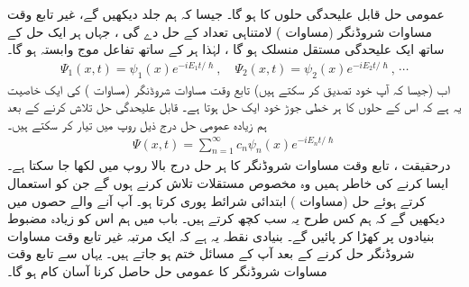  \quad
عمومی حل قابل علیحدگی حلوں کا  ہو گا۔ جیسا کہ ہم جلد دیکھیں گے، غیر تابع وقت مساوات شروڈنگر (مساوات )  لامتناہی تعداد کے حل  دے گی ،  جہاں ہر ایک حل کے ساتھ ایک علیحدگی مستقل  منسلک ہو گا ، لہٰذا ہر   کے ساتھ    تفاعل موج   وابستہ ہو گا۔ 
\begin{align*}
\Psi_{1} (x,t) = \psi_{1}(x)e^{-iE_{1}t/\hslash} , \quad \Psi_{2} (x,t) = \psi_{2}(x)e^{-iE_{2}t/\hslash}, \, \cdots 
\end{align*}
اب (جیسا کہ آپ خود تصدیق کر سکتے ہیں) تابع وقت مساوات شروڈنگر (مساوات ) کی ایک خاصیت یہ ہے کہ اس کے حلوں کا ہر خطی جوڑ خود ایک حل ہوتا ہے۔ قابل علیحدگی حل تلاش کرنے کے بعد ہم زیادہ عمومی حل درج ذیل روپ میں تیار کر سکتے ہیں۔
\begin{align}\label{مساوات_شروڈنگر_خطی_جوڑ_عمومی_حل}
\Psi (x,t) = \sum_{n=1}^{\infty} c_{n} \psi_{n}(x)e^{-iE_{n}t/\hslash}
\end{align}
درحقیقت  ، تابع وقت مساوات شروڈنگر کا ہر حل درج بالا روپ میں لکھا جا سکتا ہے۔ ایسا کرنے کی خاطر ہمیں وہ مخصوص مستقلات  تلاش کرنے ہوں گے جن کو استعمال کرتے ہوئے  حل (مساوات ) ابتدائی شرائط پوری کرتا ہو۔ آپ آنے والے حصوں میں دیکھیں گے کہ ہم کس طرح یہ سب کچھ کرتے ہیں۔ باب  میں ہم اس کو زیادہ مضبوط بنیادوں پر کھڑا کر پائیں گے۔ بنیادی نقطہ یہ ہے کہ ایک مرتبہ غیر تابع وقت مساوات شروڈنگر حل کرنے کے بعد آپ کے مسائل ختم ہو جاتے ہیں۔ یہاں سے تابع وقت مساوات شروڈنگر کا عمومی حل حاصل کرنا آسان کام ہو گا۔ 

